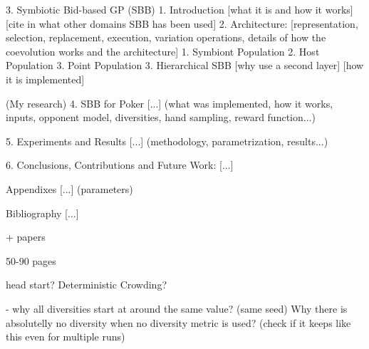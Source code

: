 3. Symbiotic Bid-based GP (SBB)
    1. Introduction
        [what it is and how it works]
        [cite in what other domains SBB has been used]
    2. Architecture: [representation, selection, replacement, execution, variation operations, details of how the coevolution works and the architecture]
        1. Symbiont Population
        2. Host Population
        3. Point Population        
    3. Hierarchical SBB
        [why use a second layer]
        [how it is implemented]

(My research)
4. SBB for Poker
[...] (what was implemented, how it works, inputs, opponent model, diversities, hand sampling, reward function...)

5. Experiments and Results
[...] (methodology, parametrization, results...)

6. Conclusions, Contributions and Future Work:
[...]

Appendixes
[...] (parameters)

Bibliography
[...]


+ papers

50-90 pages

head start?
Deterministic Crowding?


- why all diversities start at around the same value? (same seed) Why there is absolutelly no diversity when no diversity metric is used? (check if it keeps like this even for multiple runs)